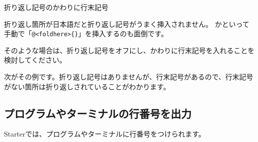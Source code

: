 \begin{starternote}{折り返し記号のかわりに行末記号}
\begin{starternoteinner}

折り返し箇所が日本語だと折り返し記号がうまく挿入されません。
かといって手動で「\texttt{@\textless{}foldhere\textgreater{}\{\}}」を挿入するのも面倒です。

そのような場合は、折り返し記号をオフにし、かわりに行末記号を入れることを検討してください。

次がその例です。折り返し記号はありませんが、行末記号があるので、行末記号がない箇所は折り返しされていることがわかります。

\end{starternoteinner}
\begin{starterprogram}\end{starterprogram}
\begin{starternoteinner}
\noindent
{}

\starterresult
\end{starternoteinner}
\begin{starterprogram}\startersetfoldmark{}\startereolmarklight{}\end{starterprogram}
\begin{starternoteinner}
\endstarterresult
\end{starternoteinner}
\end{starternote}

\subsection*{プログラムやターミナルの行番号を出力}
\label{sec:1-1-8}

Starterでは、プログラムやターミナルに行番号をつけられます。

\begin{starterprogram}\end{starterprogram}
\noindent
{}

